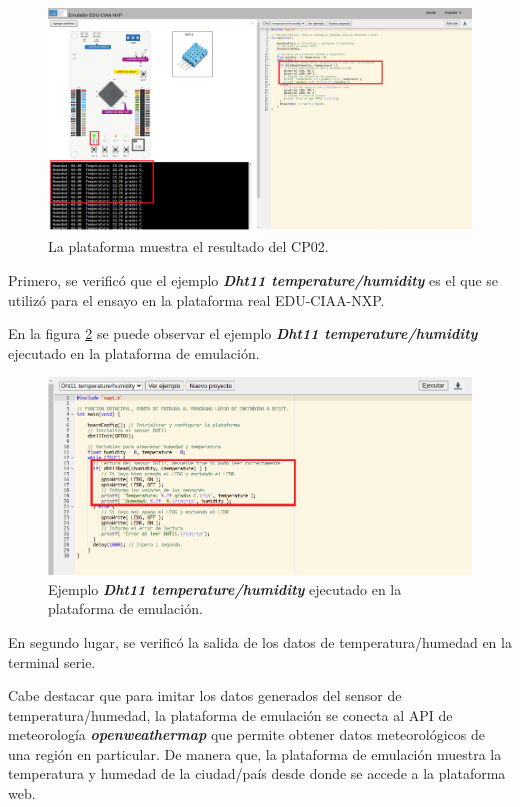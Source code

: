 \begin{figure}[ht]
	\centering
	\includegraphics[scale=.21]{./Figures/RespuestaEmulador.png}
	\caption{La plataforma muestra el resultado del CP02.}
	\label{fig:RespuestaEmulador}
\end{figure}


Primero, se verificó que el ejemplo \textit{\textbf{Dht11 temperature/humidity}} es el que se utilizó para el ensayo en la plataforma real EDU-CIAA-NXP.

En la figura \ref{fig:RespuestaEmulador2} se puede observar el ejemplo \textit{\textbf{Dht11 temperature/humidity}} ejecutado en la plataforma de emulación.


\begin{figure}[ht]
	\centering
	\includegraphics[scale=.41]{./Figures/RespuestaEmulador2.png}
	\caption{Ejemplo \textit{\textbf{Dht11 temperature/humidity}} ejecutado en la plataforma de emulación.}
	\label{fig:RespuestaEmulador2}
\end{figure}


En segundo lugar, se verificó la salida de los datos de temperatura/humedad en la terminal serie.  

Cabe destacar que para imitar los datos generados del sensor de temperatura/humedad, la plataforma de emulación se conecta al API de meteorología  \textit{\textbf{openweathermap}} que permite obtener datos meteorológicos de una región en particular. De manera que, la plataforma de emulación muestra la temperatura y humedad de la ciudad/país desde donde se accede a la plataforma web.

